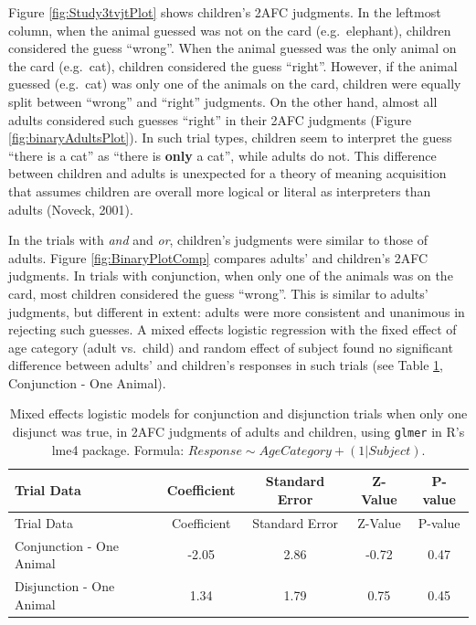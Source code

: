 \documentclass[floatsintext,man]{apa6}
\theoremstyle{definition}
\theoremstyle{definition}
\theoremstyle{definition}
\theoremstyle{remark}
\begin{document}
Figure \ref{fig:Study3tvjtPlot} shows children's 2AFC judgments. In the
leftmost column, when the animal guessed was not on the card
(e.g.~elephant), children considered the guess \enquote{wrong}. When the
animal guessed was the only animal on the card (e.g.~cat), children
considered the guess \enquote{right}. However, if the animal guessed
(e.g.~cat) was only one of the animals on the card, children were
equally split between \enquote{wrong} and \enquote{right} judgments. On
the other hand, almost all adults considered such guesses
\enquote{right} in their 2AFC judgments (Figure
\ref{fig:binaryAdultsPlot}). In such trial types, children seem to
interpret the guess \enquote{there is a cat} as \enquote{there is
\textbf{only} a cat}, while adults do not. This difference between
children and adults is unexpected for a theory of meaning acquisition
that assumes children are overall more logical or literal as
interpreters than adults (Noveck, 2001).

In the trials with \emph{and} and \emph{or}, children's judgments were
similar to those of adults. Figure \ref{fig:BinaryPlotComp} compares
adults' and children's 2AFC judgments. In trials with conjunction, when
only one of the animals was on the card, most children considered the
guess \enquote{wrong}. This is similar to adults' judgments, but
different in extent: adults were more consistent and unanimous in
rejecting such guesses. A mixed effects logistic regression with the
fixed effect of age category (adult vs.~child) and random effect of
subject found no significant difference between adults' and children's
responses in such trials (see Table \ref{tab:statsStudy3}, Conjunction -
One Animal).

\begin{longtable}[]{@{}lcccc@{}}
\caption{\label{tab:statsStudy3} Mixed effects logistic models for
conjunction and disjunction trials when only one disjunct was true, in
2AFC judgments of adults and children, using \texttt{glmer} in R's lme4
package. Formula:
\(Response \sim Age Category + (1|Subject)\).}\tabularnewline
\toprule
Trial Data & Coefficient & Standard Error & Z-Value &
P-value\tabularnewline
\midrule
\endfirsthead
\toprule
Trial Data & Coefficient & Standard Error & Z-Value &
P-value\tabularnewline
\midrule
\endhead
Conjunction - One Animal & -2.05 & 2.86 & -0.72 & 0.47\tabularnewline
Disjunction - One Animal & 1.34 & 1.79 & 0.75 & 0.45\tabularnewline
\bottomrule
\end{longtable}
\end{document}
